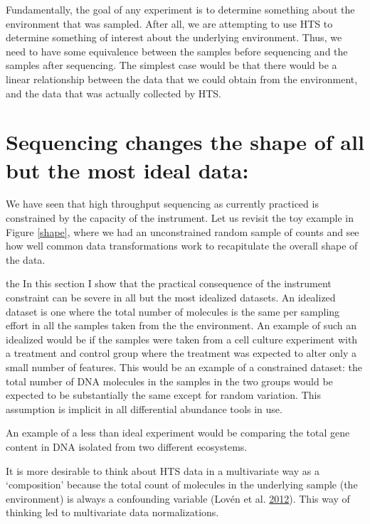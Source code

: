 \documentclass[onecolumn]{book}
\theoremstyle{definition}
\theoremstyle{definition}
\theoremstyle{definition}
\theoremstyle{remark}
\begin{document}
Fundamentally, the goal of any experiment is to determine something
about the environment that was sampled. After all, we are attempting to
use HTS to determine something of interest about the underlying
environment. Thus, we need to have some equivalence between the samples
before sequencing and the samples after sequencing. The simplest case
would be that there would be a linear relationship between the data that
we could obtain from the environment, and the data that was actually
collected by HTS.

\hypertarget{sequencing-changes-the-shape-of-all-but-the-most-ideal-data}{%
\section{Sequencing changes the shape of all but the most ideal
data:}\label{sequencing-changes-the-shape-of-all-but-the-most-ideal-data}}

We have seen that high throughput sequencing as currently practiced is
constrained by the capacity of the instrument. Let us revisit the toy
example in Figure \ref{shape}, where we had an unconstrained random
sample of counts and see how well common data transformations work to
recapitulate the overall shape of the data.

the In this section I show that the practical consequence of the
instrument constraint can be severe in all but the most idealized
datasets. An idealized dataset is one where the total number of
molecules is the same per sampling effort in all the samples taken from
the the environment. An example of such an idealized would be if the
samples were taken from a cell culture experiment with a treatment and
control group where the treatment was expected to alter only a small
number of features. This would be an example of a constrained dataset:
the total number of DNA molecules in the samples in the two groups would
be expected to be substantially the same except for random variation.
This assumption is implicit in all differential abundance tools in use.

An example of a less than ideal experiment would be comparing the total
gene content in DNA isolated from two different ecosystems.

It is more desirable to think about HTS data in a multivariate way as a
`composition' because the total count of molecules in the underlying
sample (the environment) is always a confounding variable (Lovén et al.
\protect\hyperlink{ref-Loven:2012aa}{2012}). This way of thinking led to
multivariate data normalizations.
\end{document}
